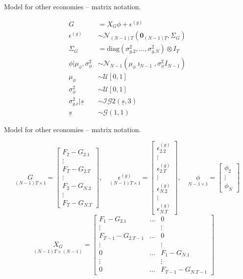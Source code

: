\documentclass[notes,blackandwhite,mathsans,usenames,dvipsnames]{beamer}
\begin{document}
\begin{frame}{Model for other economies -- matrix notation.}

\begin{align*}
G &= X_G \phi + \epsilon^{(g)}\\
\epsilon^{(g)} &\sim\mathcal{N}_{(N-1)T}\left( \mathbf{0}_{(N-1)T}, \Sigma_G \right)\\
\Sigma_G &= \text{diag}\left(\sigma_{g.2}^2,\dots,\sigma_{g.N}^2\right)\otimes I_T\\[2ex]
\phi|\mu_\phi,\sigma_\phi^2 &\sim\mathcal{N}_{N-1}\left( \mu_\phi\imath_{N-1}, \sigma_\phi^2 I_{N-1} \right)\\
\mu_\phi &\sim\mathcal{U}[0,1]\\
\sigma_\phi^2 &\sim\mathcal{U}[0,1]\\
\sigma_{g.c}^2|\underline{s} &\sim\mathcal{IG}2(\underline{s},3)\\
\underline{s}&\sim\mathcal{G}(1,1)
\end{align*}

\end{frame}




\begin{frame}{Model for other economies -- matrix notation.}

\scriptsize
$$
\underset{(N-1)T\times1}{G}=\begin{bmatrix} F_2-G_{2.1}\\ \vdots \\ F_T-G_{2.T} \\ \vdots\\ F_2-G_{N.2}\\ \vdots \\ F_T-G_{N.T}  \end{bmatrix},\quad
\underset{(N-1)T\times1}{\epsilon^{(g)}}=\begin{bmatrix} \epsilon^{(g)}_{2.2}\\ \vdots \\ \epsilon^{(g)}_{2.T} \\ \vdots\\ \epsilon^{(g)}_{N.2}\\ \vdots \\ \epsilon^{(g)}_{N.T}  \end{bmatrix},\quad
\underset{N-1\times 1}{\phi} = \begin{bmatrix} \phi_2\\ \vdots \\ \phi_N \end{bmatrix}
$$
$$
\underset{(N-1)T\times (N-1)}{X_G}=\begin{bmatrix} F_1-G_{2.1}&...&0 \\ \vdots&&\vdots \\ F_{T-1}-G_{2.T-1}&...&0 \\ \vdots&&\vdots \\ 0&...& F_1-G_{N.1}\\ \vdots&&\vdots \\ 0&...&F_{T-1}-G_{N.T-1}  \end{bmatrix}\quad
$$
\end{frame}
\end{document}
